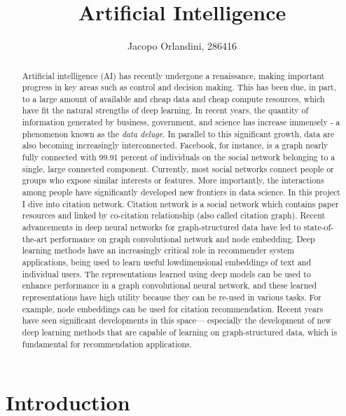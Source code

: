 \documentclass{report}
\begin{document}
\title{Artificial Intelligence}

\author{Jacopo Orlandini, 286416}

\maketitle

\begin{abstract}

Artificial intelligence (AI) has recently undergone a renaissance, making important progress in key areas such as control and decision making. This has been due, in part, to a large amount of available and cheap data and cheap compute resources, which have fit the natural strengths of deep
learning. In recent years, the quantity of information generated by business, government, and science has increase immensely - a phenomenon known as the \textit{data deluge}.
In parallel to this significant growth, data are also becoming increasingly interconnected. Facebook, for instance, is a graph nearly fully connected with 99.91 percent of individuals on the social network belonging to a single, large connected component.
Currently, most social networks connect people or groups who expose similar interests or features. More importantly, the interactions among people have significantly developed new frontiers in data science.
In this project I dive into citation network. Citation network is a social network which contains paper resources and linked by co-citation relationship (also called citation graph).
Recent advancements in deep neural networks for graph-structured data have led to state-of-the-art performance on graph convolutional network and node embedding.
Deep learning methods have an increasingly critical role in recommender
system applications, being used to learn useful lowdimensional
embeddings of text and individual users. The representations learned using deep models can be used to enhance performance in a graph convolutional neural network, and these learned representations
have high utility because they can be re-used in various tasks. For example, node embeddings can be used for citation recommendation.
Recent years have seen significant developments in this space—
especially the development of new deep learning methods that are
capable of learning on graph-structured data, which is fundamental
for recommendation applications.

\end{abstract}


\chapter{Introduction}
\end{document}
